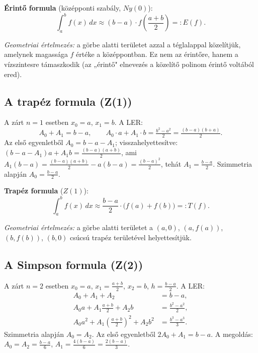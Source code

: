 \documentclass[a4paper,12pt]{article}
\theoremstyle{mydef}
\begin{document}
\begin{mdframed}[backgroundcolor=thmbg,linewidth=0pt,innertopmargin=8pt,innerbottommargin=8pt]
\textbf{Érintő formula} (középponti szabály, $Ny(0)$):
\[
  \int_a^b f(x)\,dx \approx (b-a)\cdot f\!\left(\frac{a+b}{2}\right) =: E(f).
\]
\end{mdframed}

\emph{Geometriai értelmezés:} a görbe alatti területet azzal a téglalappal közelítjük,
amelynek magassága $f$ értéke a középpontban. Ez nem az érintőre, hanem a vízszintesre
támaszkodik (az „érintő" elnevezés a közelítő polinom érintő voltából ered).

\subsection*{A trapéz formula (Z(1))}

A zárt $n=1$ esetben $x_0 = a$, $x_1 = b$.
A LER:
\[
  A_0 + A_1 = b - a, \qquad A_0 \cdot a + A_1 \cdot b = \tfrac{b^2-a^2}{2} = \tfrac{(b-a)(b+a)}{2}.
\]
Az első egyenletből $A_0 = b-a-A_1$; visszahelyettesítve: $(b-a-A_1)a + A_1 b = \tfrac{(b-a)(a+b)}{2}$,
ami $A_1(b-a) = \tfrac{(b-a)(a+b)}{2} - a(b-a) = \tfrac{(b-a)^2}{2}$, tehát $A_1 = \tfrac{b-a}{2}$.
Szimmetria alapján $A_0 = \tfrac{b-a}{2}$.

\begin{mdframed}[backgroundcolor=thmbg,linewidth=0pt,innertopmargin=8pt,innerbottommargin=8pt]
\textbf{Trapéz formula} ($Z(1)$):
\[
  \int_a^b f(x)\,dx \approx \frac{b-a}{2}\cdot\bigl(f(a) + f(b)\bigr) =: T(f).
\]
\end{mdframed}

\emph{Geometriai értelmezés:} a görbe alatti területet a $(a,0)$, $(a,f(a))$, $(b,f(b))$,
$(b,0)$ csúcsú trapéz területével helyettesítjük.

\subsection*{A Simpson formula (Z(2))}

A zárt $n=2$ esetben $x_0=a$, $x_1=\tfrac{a+b}{2}$, $x_2=b$, $h=\tfrac{b-a}{2}$.
A LER:
\begin{align*}
  A_0 + A_1 + A_2 &= b - a, \\
  A_0 a + A_1 \tfrac{a+b}{2} + A_2 b &= \tfrac{b^2-a^2}{2}, \\
  A_0 a^2 + A_1 \left(\tfrac{a+b}{2}\right)^2 + A_2 b^2 &= \tfrac{b^3-a^3}{3}.
\end{align*}
Szimmetria alapján $A_0 = A_2$. Az első egyenletből $2A_0 + A_1 = b-a$.
A megoldás: $A_0 = A_2 = \tfrac{b-a}{6}$, $A_1 = \tfrac{4(b-a)}{6} = \tfrac{2(b-a)}{3}$.
\end{document}
